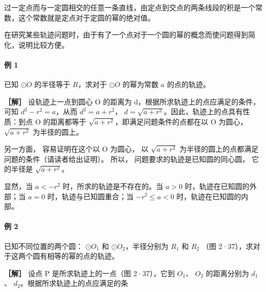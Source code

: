 过一定点而与一定圆相交的任意一条直线，由定点到交点的两条线段的积是一个常数，这个常数就是定点对于定圆的幂的绝对值。

在研究某些轨迹问题时，由于有了一个点对于一个圆的幂的概念而使问题得到简化，说明比较方便。

\paragraph{例 1}

已知 \(\odot O\) 的半径等于 \(R\)，求对于 \(\odot O\) 的幂为常数 \(a\)
的点的轨迹。

\textbf{［解］} 设轨迹上一点到圆心 O 的距离为
d，根据所求轨迹上的点应满足的条件，可知 \(d^{2}-r^{2}=a\)，从而
\(d^{2}=a+r^{2}\)， \(d=\sqrt{a+r^{2}}\)。因此，轨迹上的点具有性质：到点
O 的距离都等于 \(\sqrt{a+r^{2}}\)，即满足问题条件的点都在以 O 为圆心，
\(\sqrt{a+r^{2}}\) 为半径的圆上。

另一方面， 容易证明在这个以 O 为圆心， 以 \(\sqrt{a+r^{2}}\)
为半径的圆上的点都满足问题的条件（请读者给出证明）。 所以，
问题要求的轨迹是已知圆的同心圆， 它的半径是 \(\sqrt{a+r^{2}}\)。

显然，当 \(a < -r^2\) 时，所求的轨迹是不存在的。当 \(a > 0\)
时，轨迹在已知圆的外部；当 \(a = 0\) 时，轨迹与已知圆重合；当
\(-r^2 \leqslant a < 0\) 时，轨迹在已知圆的内部。

\paragraph{例 2}

已知不同位置的两个圆： \(\odot O_{1}\) 和 \(\odot O_{2}\)，半径分别为
\(R_{1}\) 和 \(R_{2}\) （图 2·37），求对于这两个圆有相等的幂的点的轨迹。

\textbf{［解］} 设点 P 是所求轨迹上的一点（图 2·37），它到 \(O_{1}\)、
\(O_{2}\) 的距离分别为 \(d_{1}\)、
\(d_{2}\)。根据所求轨迹上的点应满足的条

